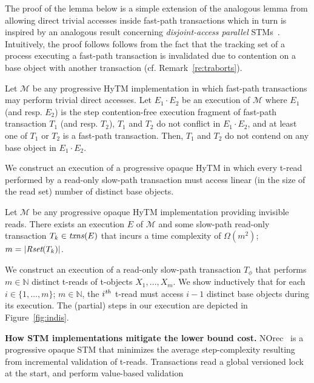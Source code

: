 The proof of the lemma below is a simple extension of the analogous lemma from \cite{hytm14disc}
allowing direct trivial accesses inside fast-path transactions which in turn is inspired by an analogous result concerning \emph{disjoint-access parallel} STMs~\cite{AHM09}. 
Intuitively, the proof follows follows from the fact that
the tracking set of a process executing a fast-path transaction is invalidated due to contention on a base
object with another transaction (cf. Remark~\ref{re:traborts}).
%
\begin{lemma}
\label{lm:hytm}
%
Let $\mathcal{M}$ be any progressive HyTM implementation in which fast-path transactions may perform trivial
direct accesses.
Let $E_1 \cdot E_2$ be an execution of $\mathcal{M}$ where
$E_1$ (and resp. $E_2$) is the step contention-free
execution fragment of fast-path transaction $T_1$ (and resp. $T_2$),
$T_1$ and $T_2$ do not conflict in $E_1 \cdot E_2$, and
at least one of $T_1$ or $T_2$ is a fast-path transaction. 
Then, $T_1$ and $T_2$ do not contend on any base object in $E_1 \cdot E_2$.
\end{lemma}
%
We construct an execution of a progressive opaque HyTM in which every t-read performed by a read-only slow-path transaction
must access linear (in the size of the read set) number of distinct base objects.
%
\begin{theorem}
\label{th:impossibility}
Let $\mathcal{M}$ be any progressive opaque HyTM implementation providing invisible reads.
There exists an execution $E$ of $\mathcal{M}$ and some slow-path read-only transaction $T_k \in \ms{txns}(E)$
that incurs a time complexity of $\Omega (m^2)$; $m=|\textit{Rset}(T_k)|$.
\end{theorem}
%
\begin{proofsketch}
We construct an execution of a read-only slow-path transaction $T_{\phi}$ that performs $m \in \mathbb{N}$
distinct t-reads of t-objects $X_1,\ldots , X_m$. We show inductively that for each 
$i\in \{1,\ldots , m\}$; $m \in \mathbb{N}$, the $i^{\ms{th}}$ t-read must access $i-1$ distinct base objects
during its execution. The (partial) steps in our execution are depicted in Figure~\ref{fig:indis}.

\end{proofsketch}
%
%
\vspace{1mm}\noindent\textbf{How STM implementations mitigate the lower bound cost.}
NOrec~\cite{norec} is a progressive opaque STM that minimizes the average step-complexity resulting from incremental 
validation of t-reads. Transactions read a global versioned lock at the start, and perform value-based validation
